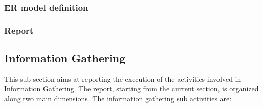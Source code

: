 \subsubsection{ER model definition}
\subsubsection{Report}






\subsection{Information Gathering}
This sub-section aims at reporting the execution of the activities involved in Information Gathering. The report, starting from the current section, is organized along two main dimensions. The information gathering sub activities are:
